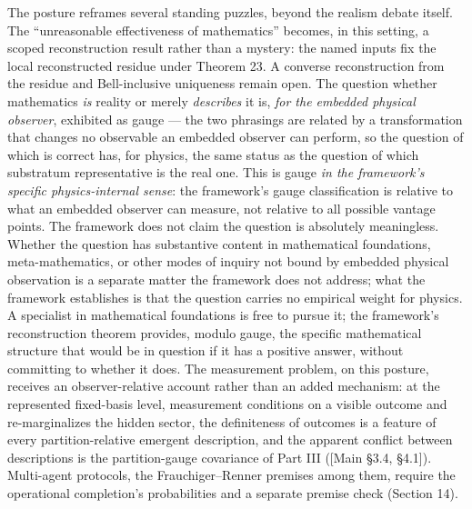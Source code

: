 \documentclass[
]{article}
\begin{document}
The posture reframes several standing puzzles, beyond the realism debate
itself. The ``unreasonable effectiveness of mathematics'' becomes, in
this setting, a scoped reconstruction result rather than a mystery: the
named inputs fix the local reconstructed residue under Theorem 23. A
converse reconstruction from the residue and Bell-inclusive uniqueness
remain open. The question whether mathematics \emph{is} reality or
merely \emph{describes} it is, \emph{for the embedded physical
observer}, exhibited as gauge --- the two phrasings are related by a
transformation that changes no observable an embedded observer can
perform, so the question of which is correct has, for physics, the same
status as the question of which substratum representative is the real
one. This is gauge \emph{in the framework's specific physics-internal
sense}: the framework's gauge classification is relative to what an
embedded observer can measure, not relative to all possible vantage
points. The framework does not claim the question is absolutely
meaningless. Whether the question has substantive content in
mathematical foundations, meta-mathematics, or other modes of inquiry
not bound by embedded physical observation is a separate matter the
framework does not address; what the framework establishes is that the
question carries no empirical weight for physics. A specialist in
mathematical foundations is free to pursue it; the framework's
reconstruction theorem provides, modulo gauge, the specific mathematical
structure that would be in question if it has a positive answer, without
committing to whether it does. The measurement problem, on this posture,
receives an observer-relative account rather than an added mechanism: at
the represented fixed-basis level, measurement conditions on a visible
outcome and re-marginalizes the hidden sector, the definiteness of
outcomes is a feature of every partition-relative emergent description,
and the apparent conflict between descriptions is the partition-gauge
covariance of Part III ({[}Main §3.4, §4.1{]}). Multi-agent protocols,
the Frauchiger--Renner premises among them, require the operational
completion's probabilities and a separate premise check (Section 14).
\end{document}
